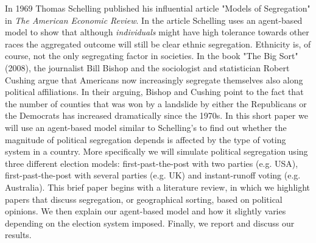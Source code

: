 \documentclass[12pt, a4paper]{article}
\begin{document}
In 1969 Thomas Schelling published his influential article "Models of Segregation" in \textit{The American Economic Review}. In the article Schelling uses an agent-based model to show that although \textit{individuals} might have high tolerance towards other races the aggregated outcome will still be clear ethnic segregation. Ethnicity is, of course, not the only segregating factor in societies. In the book "The Big Sort" (2008), the journalist Bill Bishop and the sociologist and statistician Robert Cushing argue that Americans now increasingly segregate themselves also along political affiliations. In their arguing, Bishop and Cushing point to the fact that the number of counties that was won by a landslide by either the Republicans or the Democrats has increased dramatically since the 1970s. 
\newline In this short paper we will use an agent-based model similar to Schelling's to find out whether the magnitude of political segregation depends is affected by the type of voting system in a country. More specifically we will simulate political segregation using three different election models: first-past-the-post with two parties (e.g. USA), first-past-the-post with several parties (e.g. UK) and instant-runoff voting (e.g. Australia). This brief paper begins with a literature review, in which we highlight papers that discuss segregation, or geographical sorting, based on political opinions. We then explain our agent-based model and how it slightly varies depending on the election system imposed. Finally, we report and discuss our results.


\end{document}
